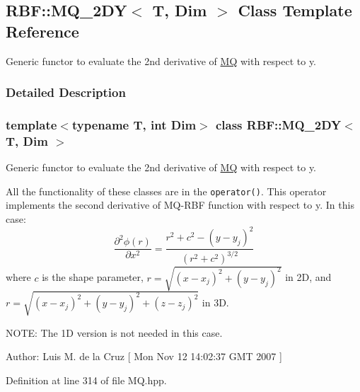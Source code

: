 \hypertarget{classRBF_1_1MQ__2DY}{
\subsection{RBF::MQ\_\-2DY$<$ T, Dim $>$ Class Template Reference}
\label{classRBF_1_1MQ__2DY}
}
Generic functor to evaluate the 2nd derivative of \hyperlink{classRBF_1_1MQ}{MQ} with respect to y.  




\subsubsection{Detailed Description}
\subsubsection*{template$<$typename T, int Dim$>$ class RBF::MQ\_\-2DY$<$ T, Dim $>$}

Generic functor to evaluate the 2nd derivative of \hyperlink{classRBF_1_1MQ}{MQ} with respect to y. 

All the functionality of these classes are in the {\tt operator()}. This operator implements the second derivative of MQ-RBF function with respect to y. In this case: \[ \frac{\partial^2 \phi(r)}{\partial x^2} = \frac{r^2 + c^2 - (y-y_j)^2}{(r^2+c^2)^{3/2}} \] where $ c $ is the shape parameter, $ r = \sqrt{(x - x_j)^2 + (y - y_j)^2} $ in 2D, and $ r = \sqrt{(x - x_j)^2 + (y - y_j)^2 + (z - z_j)^2} $ in 3D. \begin{Desc}
\item[NOTE: The 1D version is not needed in this case.]\end{Desc}
\begin{Desc}
\item[Author:]Luis M. de la Cruz \mbox{[} Mon Nov 12 14:02:37 GMT 2007 \mbox{]} \end{Desc}


Definition at line 314 of file MQ.hpp.